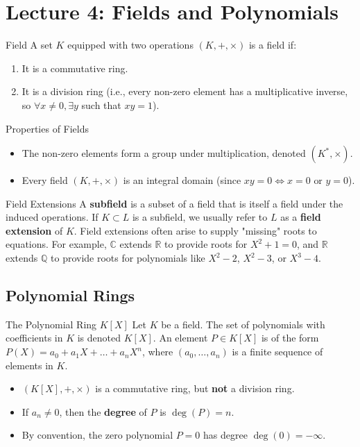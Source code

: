 \documentclass[11pt, a4paper]{article}
\newcommand{\R}{\mathbb{R}}
\newcommand{\Q}{\mathbb{Q}}
\newcommand{\C}{\mathbb{C}}
\begin{document}
\section{Lecture 4: Fields and Polynomials}

\begin{definition}{Field}{}
A set $K$ equipped with two operations $(K, +, \times)$ is a field if:
\begin{enumerate}
    \item It is a commutative ring. 
    \item It is a division ring (i.e., every non-zero element has a multiplicative inverse, so $\forall x \neq 0, \exists y$ such that $xy = 1$). 
\end{enumerate}
\end{definition}

\begin{remark}{Properties of Fields}{}
\begin{itemize}
    \item The non-zero elements form a group under multiplication, denoted $(K^*, \times)$. 
    \item Every field $(K, +, \times)$ is an integral domain (since $xy = 0 \iff x = 0 \text{ or } y = 0$). 
\end{itemize}
\end{remark}

\begin{definition}{Field Extensions}{}
A \textbf{subfield} is a subset of a field that is itself a field under the induced operations. 
If $K \subset L$ is a subfield, we usually refer to $L$ as a \textbf{field extension} of $K$. 
Field extensions often arise to supply "missing" roots to equations.  
For example, $\C$ extends $\R$ to provide roots for $X^2 + 1 = 0$, and $\R$ extends $\Q$ to provide roots for polynomials like $X^2 - 2$, $X^2 - 3$, or $X^3 - 4$. 
\end{definition}

\subsection{Polynomial Rings}

\begin{definition}{The Polynomial Ring $K[X]$}{}
Let $K$ be a field. The set of polynomials with coefficients in $K$ is denoted $K[X]$. 
An element $P \in K[X]$ is of the form $P(X) = a_0 + a_1X + \dots + a_nX^n$, where $(a_0, \dots, a_n)$ is a finite sequence of elements in $K$. 
\begin{itemize}
    \item $(K[X], +, \times)$ is a commutative ring, but \textbf{not} a division ring. 
    \item If $a_n \neq 0$, then the \textbf{degree} of $P$ is $\deg(P) = n$. 
    \item By convention, the zero polynomial $P = 0$ has degree $\deg(0) = -\infty$. 
\end{itemize}
\end{definition}
\end{document}
